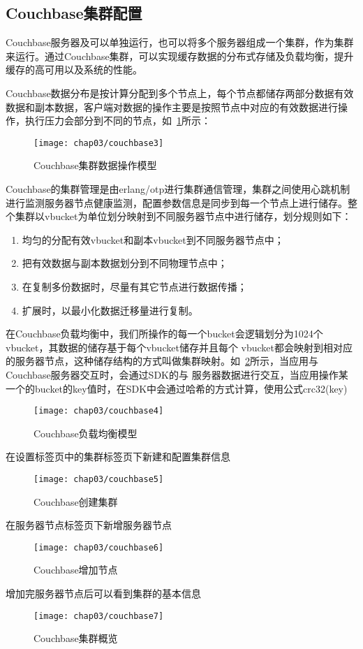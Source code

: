 \subsection{Couchbase集群配置}
Couchbase服务器及可以单独运行，也可以将多个服务器组成一个集群，作为集群来运行。通过Couchbase集群，可以实现缓存数据的分布式存储及负载均衡，提升缓存的高可用以及系统的性能\cite{brown2013developing}。

Couchbase数据分布是按计算分配到多个节点上，每个节点都储存两部分数据有效数据和副本数据，客户端对数据的操作主要是按照节点中对应的有效数据进行操作，执行压力会部分到不同的节点，如~\ref{fig:couchbase3}所示：
\begin{figure}[H] %
  \centering
  \texttt{[image: chap03/couchbase3]}
  \caption{Couchbase集群数据操作模型}
  \label{fig:couchbase3}
\end{figure}
Couchbase的集群管理是由erlang/otp进行集群通信管理，集群之间使用心跳机制进行监测服务器节点健康监测，配置参数信息是同步到每一个节点上进行储存。整个集群以vbucket为单位划分映射到不同服务器节点中进行储存，划分规则如下：
\begin{enumerate}
\item 均匀的分配有效vbucket和副本vbucket到不同服务器节点中；
\item 把有效数据与副本数据划分到不同物理节点中；
\item 在复制多份数据时，尽量有其它节点进行数据传播；
\item 扩展时，以最小化数据迁移量进行复制。
\end{enumerate}

在Couchbase负载均衡中，我们所操作的每一个bucket会逻辑划分为1024个vbucket，其数据的储存基于每个vbucket储存并且每个 vbucket都会映射到相对应的服务器节点，这种储存结构的方式叫做集群映射。如~\ref{fig:couchbase4}所示，当应用与Couchbase服务器交互时，会通过SDK的与 服务器数据进行交互，当应用操作某一个的bucket的key值时，在SDK中会通过哈希的方式计算，使用公式crc32(key)%
\begin{figure}[H] %
  \centering
  \texttt{[image: chap03/couchbase4]}
  \caption{Couchbase负载均衡模型}
  \label{fig:couchbase4}
\end{figure}
在设置标签页中的集群标签页下新建和配置集群信息
\begin{figure}[H] %
  \centering
  \texttt{[image: chap03/couchbase5]}
  \caption{Couchbase创建集群}
  \label{fig:couchbase5}
\end{figure}
在服务器节点标签页下新增服务器节点
\begin{figure}[H] %
  \centering
  \texttt{[image: chap03/couchbase6]}
  \caption{Couchbase增加节点}
  \label{fig:couchbase6}
\end{figure}
增加完服务器节点后可以看到集群的基本信息
\begin{figure}[H] %
  \centering
  \texttt{[image: chap03/couchbase7]}
  \caption{Couchbase集群概览}
  \label{fig:couchbase7}
\end{figure}

